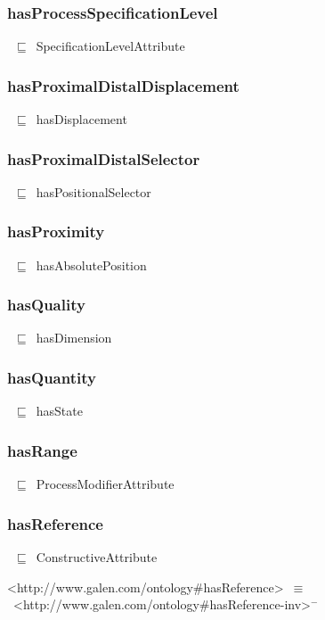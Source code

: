 \documentclass{article}
\begin{document}
\subsubsection*{hasProcessSpecificationLevel}

~\ensuremath{\sqsubseteq}~SpecificationLevelAttribute

\subsubsection*{hasProximalDistalDisplacement}

~\ensuremath{\sqsubseteq}~hasDisplacement

\subsubsection*{hasProximalDistalSelector}

~\ensuremath{\sqsubseteq}~hasPositionalSelector

\subsubsection*{hasProximity}

~\ensuremath{\sqsubseteq}~hasAbsolutePosition

\subsubsection*{hasQuality}

~\ensuremath{\sqsubseteq}~hasDimension

\subsubsection*{hasQuantity}

~\ensuremath{\sqsubseteq}~hasState

\subsubsection*{hasRange}

~\ensuremath{\sqsubseteq}~ProcessModifierAttribute

\subsubsection*{hasReference}

~\ensuremath{\sqsubseteq}~ConstructiveAttribute

<http://www.galen.com/ontology#hasReference>~\ensuremath{\equiv}~<http://www.galen.com/ontology#hasReference-inv>\ensuremath{^-}
\end{document}

